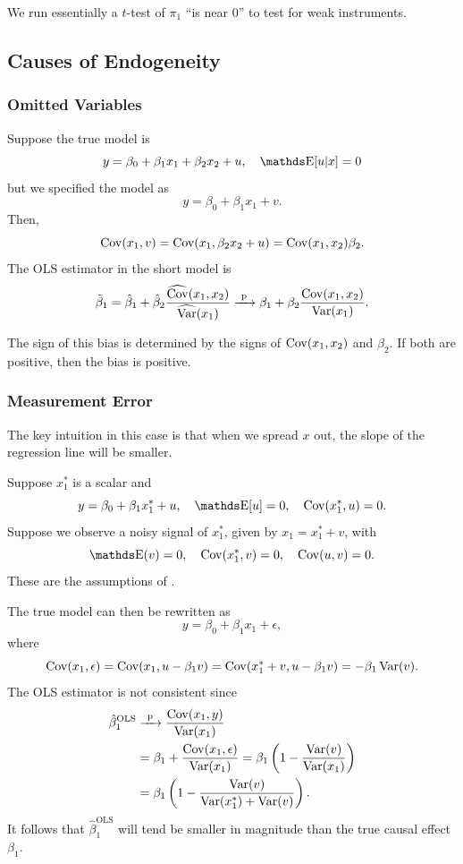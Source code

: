 \documentclass[letterpaper, 10pt]{article}
\DeclareMathOperator{\OLS}{OLS}
\begin{document}
We run essentially a \(t\)-test of \(\pi_1\) ``is near \(0\)'' to test for weak instruments.


\subsection{Causes of Endogeneity}
\subsubsection{Omitted Variables}
Suppose the true model is
\[
  y = \beta_0 + \beta_1 x_1 + \beta_2 x_2 + u, \quad
  \E[u|x] = 0
\]
but we specified the model as
\[
  y = \beta_0 + \beta_1 x_1 + v.
\]
Then,
\[
  \operatorname{Cov}(x_1, v)
  = \operatorname{Cov}(x_1, \beta_2 x_2 + u)
  = \operatorname{Cov}(x_1, x_2) \beta_2.
\]
The OLS estimator in the short model is
\[
  \tilde{\beta}_1
  = \hat{\beta}_1 + \hat{\beta}_2 \frac{\widehat{\operatorname{Cov}}(x_1, x_2)}{\widehat{\operatorname{Var}}(x_1)}
  \xrightarrow{\ \mathrm{p}\ } \beta_1 + \beta_2 \frac{\operatorname{Cov}(x_1, x_2)}{\operatorname{Var}(x_1)}.
\]
\begin{remark}
  The sign of this bias is determined by the signs of \(\operatorname{Cov}(x_1, x_2)\) and \(\beta_2\).
  If both are positive, then the bias is positive.
\end{remark}

\subsubsection{Measurement Error}
The key intuition in this case is that when we spread \(x\) out, the slope of the regression line will be smaller.

Suppose \(x_1^*\) is a scalar and
\[
  y = \beta_0 + \beta_1 x_1^* + u, \quad
  \E[u] = 0, \quad
  \Cov(x_1^*, u) = 0.
\]
Suppose we observe a noisy signal of \(x_1^*\), given by \(x_1 = x_1^* + v\), with
\[
  \E(v) = 0, \quad
  \Cov(x_1^*, v) = 0, \quad
  \Cov(u, v) = 0.
\]
These are the assumptions of .

The true model can then be rewritten as
\[
  y = \beta_0 + \beta_1 x_1 + \epsilon,
\]
where
\[
  \operatorname{Cov}(x_1, \epsilon)
  = \operatorname{Cov}(x_1, u - \beta_1 v)
  = \operatorname{Cov}(x_1^* + v, u - \beta_1 v)
  = - \beta_1 \operatorname{Var}(v).
\]
The OLS estimator is not consistent since
\begin{align*}
  \hat{\beta}_1^{\OLS}
  &\longprobto \frac{\Cov(x_1, y)}{\Var(x_1)} \\
  &= \beta_1 + \frac{\Cov(x_1, \epsilon)}{\Var(x_1)}
  = \beta_1 \left( 1 - \frac{\Var(v)}{\Var(x_1)} \right) \\
  &= \beta_1 \left( 1 - \frac{\Var(v)}{\Var(x_1^*) + \Var(v)} \right).
\end{align*}
It follows that \(\hat{\beta}_1^{\OLS}\) will tend be smaller in magnitude than the true causal effect \(\beta_1\).
\end{document}
